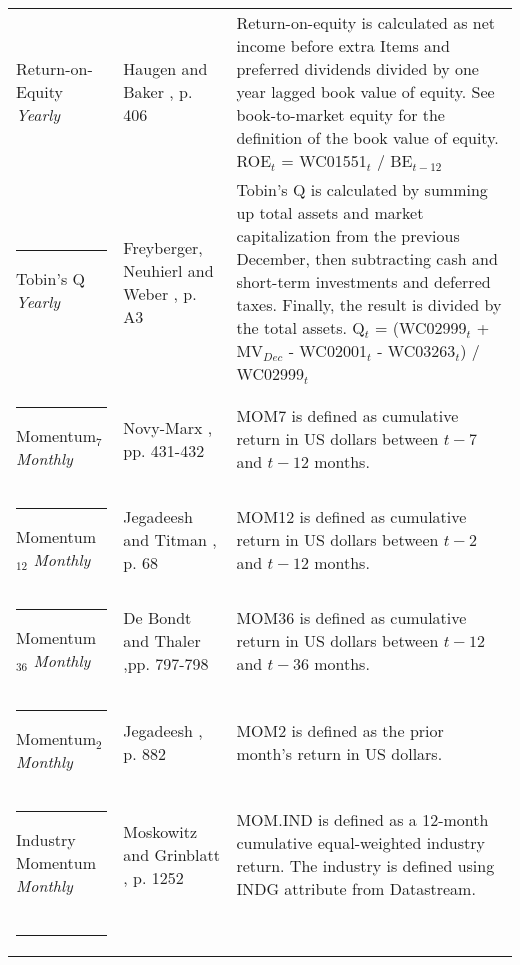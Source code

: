 \documentclass[12pt]{article}
\begin{document}
\begin{appendices}
{{\begin{xltabular}{\textwidth}{ >{\raggedright\arraybackslash}p{0.23\textwidth} >{\raggedright\arraybackslash}p{0.2\textwidth} X}
Return-on-Equity \newline \emph{Yearly}		& Haugen and Baker \citeyearpar{HAUGEN1996}, p. 406		& Return-on-equity is calculated as net income before extra Items and preferred dividends divided by one year lagged book value of equity. See book-to-market equity for the definition of the book value of equity. \newline ROE$_t$ = WC01551$_{t}$ / BE$_{t-12}$ \\ \rule{-1ex}{3ex}
Tobin's Q 	\newline \emph{Yearly}			& Freyberger, Neuhierl and Weber \citeyearpar{Freyberger2020}, p. A3 & Tobin's Q is calculated by summing up total assets and market capitalization from the previous December, then subtracting cash and short-term investments and deferred taxes. Finally, the result is divided by the total assets. \newline Q$_t$ = (WC02999$_{t}$ + MV$_{Dec}$ - WC02001$_{t}$ - WC03263$_{t}$) / WC02999$_{t}$ \\ \rule{-1ex}{3ex}
Momentum$_{7}$ \newline \emph{Monthly}	& Novy-Marx \citeyearpar{NOVYMARX2012}, pp. 431-432	& MOM7 is defined as cumulative return in US dollars between $t-7$ and $t-12$ months.\\ \rule{-1ex}{3ex}
Momentum$_{12}$ \newline \emph{Monthly}	& Jegadeesh and Titman \citeyearpar{Jegadeesh1993}, p. 68	& MOM12 is defined as cumulative return in US dollars between $t-2$ and $t-12$ months.\\ \rule{-1ex}{3ex}
Momentum$_{36}$ \newline \emph{Monthly}	& De Bondt and Thaler \citeyearpar{DeBondt1985},\newline pp. 797-798 & MOM36 is defined as cumulative return in US dollars between $t-12$ and $t-36$ months.\\ \rule{-1ex}{3ex}
Momentum$_{2}$ \newline \emph{Monthly}	& Jegadeesh \citeyearpar{Jegadeesh1990}, p. 882			& MOM2 is defined as the prior month's return in US dollars.\\ \rule{-1ex}{3ex}
Industry Momentum \newline \emph{Monthly} 	& Moskowitz and Grinblatt \citeyearpar{Moskowitz1999}, p. 1252& MOM.IND is defined as a 12-month cumulative equal-weighted industry return. The industry is defined using INDG attribute from Datastream.\footnotemark {} \\ \rule{-1ex}{3ex}

\end{xltabular}}}
\end{appendices}
\end{document}
